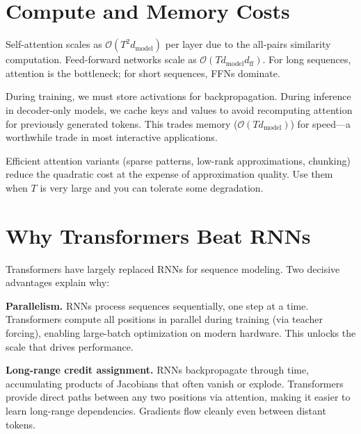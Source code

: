 \section{Compute and Memory Costs}
\label{sec:complexity}

Self-attention scales as $\mathcal{O}(T^2 d_{\text{model}})$ per layer due to the all-pairs similarity computation. Feed-forward networks scale as $\mathcal{O}(T d_{\text{model}} d_{\text{ff}})$. For long sequences, attention is the bottleneck; for short sequences, FFNs dominate.

During training, we must store activations for backpropagation. During inference in decoder-only models, we cache keys and values to avoid recomputing attention for previously generated tokens. This trades memory ($\mathcal{O}(T d_{\text{model}})$) for speed---a worthwhile trade in most interactive applications.

Efficient attention variants (sparse patterns, low-rank approximations, chunking) reduce the quadratic cost at the expense of approximation quality. Use them when $T$ is very large and you can tolerate some degradation.

\vspace{1.2em}

\section{Why Transformers Beat RNNs}
\label{sec:why_beats_rnns}

Transformers have largely replaced RNNs for sequence modeling. Two decisive advantages explain why:

\textbf{Parallelism.} RNNs process sequences sequentially, one step at a time. Transformers compute all positions in parallel during training (via teacher forcing), enabling large-batch optimization on modern hardware. This unlocks the scale that drives performance.

\textbf{Long-range credit assignment.} RNNs backpropagate through time, accumulating products of Jacobians that often vanish or explode. Transformers provide direct paths between any two positions via attention, making it easier to learn long-range dependencies. Gradients flow cleanly even between distant tokens.

